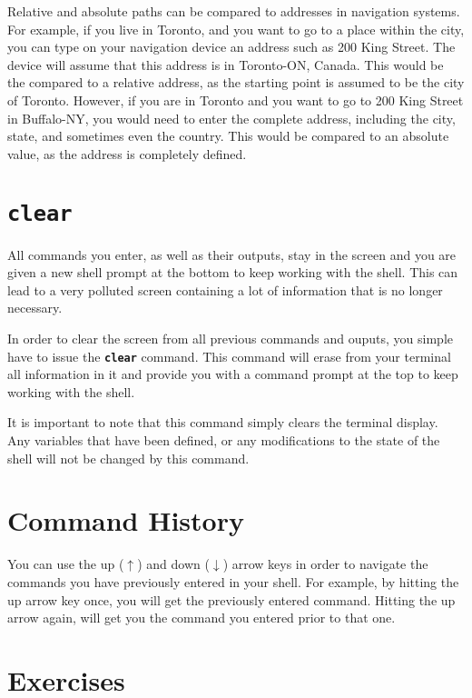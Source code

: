Relative and absolute paths can be compared to addresses in navigation systems. For example, if you live in Toronto, and you want to go to a place within the city, you can type on your navigation device an address such as 200 King Street. The device will assume that this address is in Toronto-ON, Canada. This would be the compared to a relative address, as the starting point is assumed to be the city of Toronto. However, if you are in Toronto and you want to go to 200 King Street in Buffalo-NY, you would need to enter the complete address, including the city, state, and sometimes even the country. This would be compared to an absolute value, as the address is completely defined.

\section{\textbf{\texttt{clear}}}

All commands you enter, as well as their outputs, stay in the screen and you are given a new shell prompt at the bottom to keep working with the shell. This can lead to a very polluted screen containing a lot of information that is no longer necessary.

In order to clear the screen from all previous commands and ouputs, you simple have to issue the \textbf{\texttt{clear}} command. This command will erase from your terminal all information in it and provide you with a command prompt at the top to keep working with the shell.

It is important to note that this command simply clears the terminal display. Any variables that have been defined, or any modifications to the state of the shell will not be changed by this command.

\section{Command History}

You can use the up ($\uparrow$) and down ($\downarrow$) arrow keys in order to navigate the commands you have previously entered in your shell. For example, by hitting the up arrow key once, you will get the previously entered command. Hitting the up arrow again, will get you the command you entered prior to that one.

\section*{Exercises}

